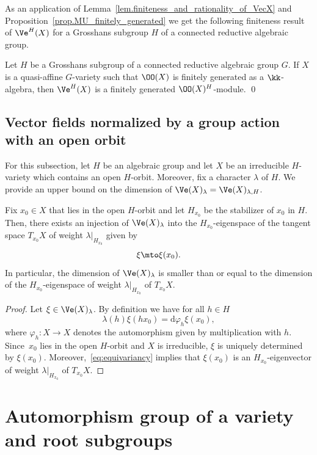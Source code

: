 As an application of Lemma~\ref{lem.finiteness_and_rationality_of_VecX} and
Proposition~\ref{prop.MU_finitely_generated} we get the following
finiteness result of $\Ve^{H}(X)$ for a Grosshans subgroup $H$ of a connected reductive
algebraic group.

\begin{corollary}
\label{cor.VecUX_finitely_generated}
Let $H$ be a Grosshans subgroup of a connected reductive algebraic group
$G$. If $X$ is a quasi-affine $G$-variety
such that $\OO(X)$ is finitely generated as a $\kk$-algebra, then
$\Ve^{H}(X)$ is a finitely generated $\OO(X)^{H}$-module. \qed
\end{corollary}

\subsection{Vector fields normalized by a group action with an open orbit}

For this subsection, let $H$ be an algebraic group and let $X$ be an irreducible
$H$-variety which contains an open $H$-orbit.
Moreover, fix a character $\lambda$ of $H$. We provide an upper bound on the dimension of
$\Ve(X)_\lambda = \Ve(X)_{\lambda, H}$.

\begin{lemma}
\label{lem:Normalized_Derivations}
Fix $x_0 \in X$ that lies in the open $H$-orbit and let $H_{x_0}$ be
the stabilizer of $x_0$ in $H$. Then, there exists an injection
of $\Ve(X)_\lambda$ into the $H_{x_0}$-eigenspace of the tangent space $T_{x_0} X$
of weight $\lambda |_{H_{x_0}}$ given by
\[
\xi \mto \xi(x_0).
\]
In particular, the dimension of $\Ve(X)_\lambda$ is smaller than or equal to the
dimension of the
$H_{x_0}$-eigenspace of weight $\lambda |_{H_{x_0}}$ of $T_{x_0} X$.
\end{lemma}

\begin{proof}
Let $\xi \in \Ve(X)_\lambda$. By definition we have for all $h \in H$
\[
\label{eq:equivariancy}
\tag{$\varobar$}
\lambda(h) \xi(hx_0) = \textrm{d} \varphi_h \xi(x_0),
\]
where $\varphi_h \colon X \to X$ denotes the automorphism given by
multiplication with $h$. Since~$x_0$ lies in the open $H$-orbit and $X$ is irreducible,
$\xi$ is uniquely determined by $\xi(x_0)$. Moreover,~\eqref{eq:equivariancy} implies that $\xi(x_0)$ is an
$H_{x_0}$-eigenvector of weight $\lambda |_{H_{x_0}}$ of $T_{x_0} X$.
\end{proof}

\section{Automorphism group of a variety and root subgroups}
\label{sec.AutomorphismGroups}

